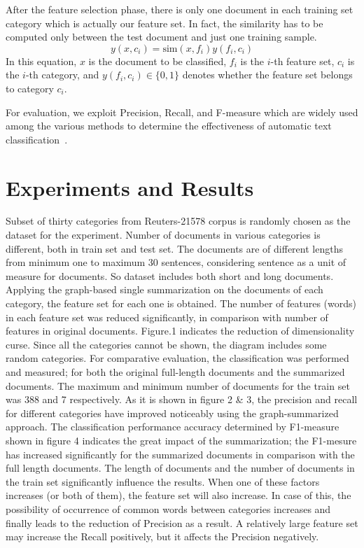 \documentclass{sigchi}
\begin{document}
After the feature selection phase, there is only one document in each training set category which is actually our feature set. 
In fact, the similarity has to be computed only between the test document and just one training sample.
\begin{equation}
 y(x,c_i)=\mbox{sim}(x,f_i)y(f_i,c_i)
\end{equation}
In this equation, $x$ is the document to be classified, $f_i$ is the $i$-th feature set, $c_i$ is the $i$-th category, and $y(f_i,c_i)\in\{0,1\}$ denotes whether the feature set belongs to category $c_i$.

For evaluation, we exploit Precision, Recall, and F-measure which are widely used among the various methods to determine the effectiveness of automatic text classification~\cite{ikonomakis2005text, 5950}.

\section{Experiments and Results}\label{sectionExperiments}
Subset of thirty categories from Reuters-21578 corpus is randomly chosen as the dataset for the experiment. 
Number of documents in various categories is different, both in train set and test set. The documents are of different lengths from minimum one to maximum 30 sentences, considering sentence as a unit of measure for documents. So dataset includes both short and long documents.
Applying the graph-based single summarization on the documents of each category, the feature set for each one is obtained. 
The number of features (words) in each feature set was reduced significantly, in comparison with number of features in original documents. 
Figure.1 indicates the reduction of dimensionality curse. 
Since all the categories cannot be shown, the diagram includes some random categories.
For comparative evaluation, the classification was performed and measured; 
for both the original full-length documents and the summarized documents. 
The maximum and minimum number of documents for the train set was 388 and 7 respectively. As it is shown in figure 2 \& 3, the precision and recall for different categories have improved noticeably using the graph-summarized approach. 
The classification performance accuracy determined by F1-measure shown in figure 4 indicates the great impact of the summarization; 
the F1-mesure has increased significantly for the summarized documents in comparison with the full length documents.
The length of documents and the number of documents in the train set significantly influence the results. 
When one of these factors increases (or both of them), the feature set will also increase. 
In case of this, the possibility of occurrence of common words between categories increases and finally leads to the reduction of Precision as a result. 
A relatively large feature set may increase the Recall positively, but it affects the Precision negatively.
\end{document}

